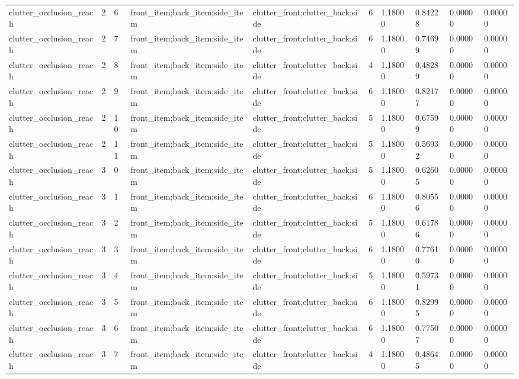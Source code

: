 \documentclass{article}
\begin{document}
\begin{table}[tbp]
{\begin{tabular}{llllllllll}
clutter\_occlusion\_reach & 2 & 6 & front\_item;back\_item;side\_item & clutter\_front;clutter\_back;side & 6 & 1.18000 & 0.84228 & 0.00000 & 0.00000 \\
clutter\_occlusion\_reach & 2 & 7 & front\_item;back\_item;side\_item & clutter\_front;clutter\_back;side & 6 & 1.18000 & 0.74699 & 0.00000 & 0.00000 \\
clutter\_occlusion\_reach & 2 & 8 & front\_item;back\_item;side\_item & clutter\_front;clutter\_back;side & 4 & 1.18000 & 0.48289 & 0.00000 & 0.00000 \\
clutter\_occlusion\_reach & 2 & 9 & front\_item;back\_item;side\_item & clutter\_front;clutter\_back;side & 6 & 1.18000 & 0.82177 & 0.00000 & 0.00000 \\
clutter\_occlusion\_reach & 2 & 10 & front\_item;back\_item;side\_item & clutter\_front;clutter\_back;side & 5 & 1.18000 & 0.67599 & 0.00000 & 0.00000 \\
clutter\_occlusion\_reach & 2 & 11 & front\_item;back\_item;side\_item & clutter\_front;clutter\_back;side & 5 & 1.18000 & 0.56932 & 0.00000 & 0.00000 \\
clutter\_occlusion\_reach & 3 & 0 & front\_item;back\_item;side\_item & clutter\_front;clutter\_back;side & 5 & 1.18000 & 0.62605 & 0.00000 & 0.00000 \\
clutter\_occlusion\_reach & 3 & 1 & front\_item;back\_item;side\_item & clutter\_front;clutter\_back;side & 6 & 1.18000 & 0.80556 & 0.00000 & 0.00000 \\
clutter\_occlusion\_reach & 3 & 2 & front\_item;back\_item;side\_item & clutter\_front;clutter\_back;side & 5 & 1.18000 & 0.61786 & 0.00000 & 0.00000 \\
clutter\_occlusion\_reach & 3 & 3 & front\_item;back\_item;side\_item & clutter\_front;clutter\_back;side & 6 & 1.18000 & 0.77610 & 0.00000 & 0.00000 \\
clutter\_occlusion\_reach & 3 & 4 & front\_item;back\_item;side\_item & clutter\_front;clutter\_back;side & 5 & 1.18000 & 0.59731 & 0.00000 & 0.00000 \\
clutter\_occlusion\_reach & 3 & 5 & front\_item;back\_item;side\_item & clutter\_front;clutter\_back;side & 6 & 1.18000 & 0.82995 & 0.00000 & 0.00000 \\
clutter\_occlusion\_reach & 3 & 6 & front\_item;back\_item;side\_item & clutter\_front;clutter\_back;side & 6 & 1.18000 & 0.77507 & 0.00000 & 0.00000 \\
clutter\_occlusion\_reach & 3 & 7 & front\_item;back\_item;side\_item & clutter\_front;clutter\_back;side & 4 & 1.18000 & 0.48645 & 0.00000 & 0.00000 \\

\end{tabular}}
\end{table}
\end{document}
